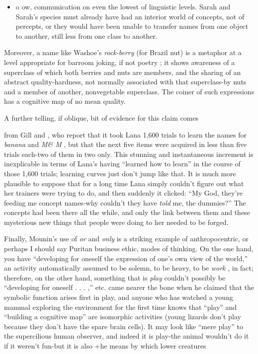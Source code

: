 \begin{itemize}
\item o ow, communication on even the lowest of linguistic levels. Sarah and Sarah's species must already have had an interior world of con\-cepts, not of percepts, or they would have been unable to transfer names from one object to another, still less from one class to another.
\end{itemize}


Moreover, a name like Washoe's \textit{rock-berry} (for Brazil nut) is a meta\-phor at a level appropriate for barroom joking, if not poetry ; it shows awareness of a superclass of which both berries and nuts are members, and the sharing of an abstract quality-hardness, not normally asso\-ciated with that superclass-by nuts and a member of another, non\-vegetable superclass. The coiner of such expressions has a cognitive map of no mean quality.

A further telling, if oblique, bit of evidence for this claim comes

from Gill and \citet{Rumbaugh1974}, who report that it took Lana 1,600 trials to learn the names for \textit{banana} and \textit{M\& M} , but that the next five items were acquired in less than five trials each-two of them in two only. This stunning and instantaneous increment is inexplicable in terms of Lana's having ``learned how to learn'' in the course of those 1,600 trials; learning curves just don't jump like that. It is much more plausible to suppose that for a long time Lana simply couldn't figure out what her trainers were trying to do, and then suddenly it clicked: ``My God, they're feeding me concept names-why couldn't they have \textit{told} me, the dummies?'' The concepts had been there all the while, and only the link between them and these mysterious new things that people were doing to her needed to be forged.

Finally, Mounin's use of \textit{or} and \textit{only} is a striking example of anthropocentric, or perhaps I should say Puritan business ethic, modes of thinking. On the one hand, you have ``developing for oneself the expression of one's own view of the world,'' an activity automatically assumed to be solemn, to be heavy, to be \textit{work} , in fact; therefore, on the other hand, something that is \textit{play} couldn't possibly be ``de\-veloping for oneself . . . ,'' etc. \citet{Piaget1962} came nearer the bone when he claimed that the symbolic function arises first in play, and anyone who has watched a young mammal exploring the environment for the first time knows that ``play'' and ``building a cognitive map'' are isomorphic activities (young lizards don't play because they don't have the spare brain cells). It may look like ``mere play'' to the super\-cilious human observer, and indeed it is play-the animal wouldn't do it if it weren't fun-but it is also +he means by which lower creatures

